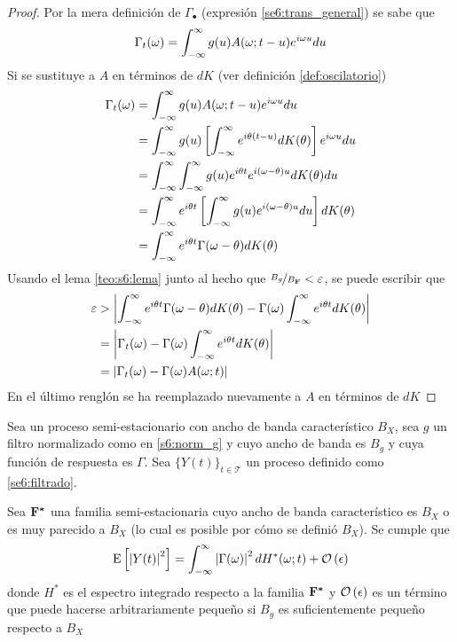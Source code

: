 \begin{proof}
Por la mera definición de $\Gamma_\bullet$ (expresión \ref{se6:trans_general}) se sabe que
\begin{equation*}
\Gamma_t (\omega) = \int_{-\infty}^{\infty} g(u) A(\omega; t-u) e^{i \omega u} du
\end{equation*}
Si se sustituye a $A$ en términos de $dK$ (ver definición \ref{def:oscilatorio})
\begin{align*}
\Gamma_t (\omega) &= \int_{-\infty}^{\infty} g(u) A(\omega; t-u) e^{i \omega u} du \\
&= 
\int_{-\infty}^{\infty} g(u) \left[ \int_{-\infty}^{\infty} e^{i \theta (t-u)} dK(\theta) \right] e^{i \omega u} du \\
&=
\int_{-\infty}^{\infty} \int_{-\infty}^{\infty} g(u) e^{i \theta t} e^{i (\omega- \theta) u} dK(\theta) du \\
&=
\int_{-\infty}^{\infty} e^{i \theta t} \left[ \int_{-\infty}^{\infty} g(u) e^{i (\omega- \theta) u} du \right] dK(\theta) \\
&=
\int_{-\infty}^{\infty} e^{i \theta t} \Gamma(\omega - \theta) dK(\theta) \\
\end{align*}
Usando el lema \ref{teo:s6:lema} junto al hecho que $\nicefrac{B_g}{B_{\mathbf{F}}} < \varepsilon$, se puede escribir que
\begin{align*}
\varepsilon 
&> 
\left| \int_{-\infty}^{\infty} e^{i \theta t} \Gamma(\omega - \theta) dK(\theta) - 
\Gamma(\omega) \int_{-\infty}^{\infty} e^{i \theta t} dK(\theta)  \right| \\
&=
\left| \Gamma_t (\omega) - 
\Gamma(\omega) \int_{-\infty}^{\infty} e^{i \theta t} dK(\theta)  \right| \\
&=
\left| \Gamma_t (\omega) - 
\Gamma(\omega) A(\omega; t)  \right|
\end{align*}
En el último renglón se ha reemplazado nuevamente a $A$ en términos de $dK	$
\end{proof}

\begin{teorema}
Sea \xt un proceso semi-estacionario con ancho de banda característico $B_X$, sea $g$ un filtro normalizado como en \ref{s6:norm_g} y cuyo ancho de banda es $B_g$ y cuya función de respuesta es $\Gamma$. 
%
Sea $\{Y(t)\}_{t\in \mathcal{T}}$ un proceso definido como \ref{se6:filtrado}.

Sea $\mathbf{F}^{\boldsymbol{*}}$ una familia semi-estacionaria cuyo ancho de banda característico es $B_X$ o es muy parecido a $B_X$ (lo cual es posible por cómo se definió $B_X$).
Se cumple que
\begin{equation}
\mathrm{E}\left[ \left| Y(t) \right|^{2} \right] = \int_{-\infty}^{\infty} \left| \Gamma(\omega) \right|^{2} dH^{*}(\omega; t) + \mathcal{O}\left( \epsilon \right)
\end{equation}
donde $H^{*}$ es el espectro integrado respecto a la familia $\mathbf{F}^{\boldsymbol{*}}$ y $\mathcal{O}\left( \epsilon \right)$ es un término que puede hacerse arbitrariamente pequeño si $B_g$ es suficientemente pequeño respecto a $B_X$
\label{teo:aprox_orden}
\end{teorema}


